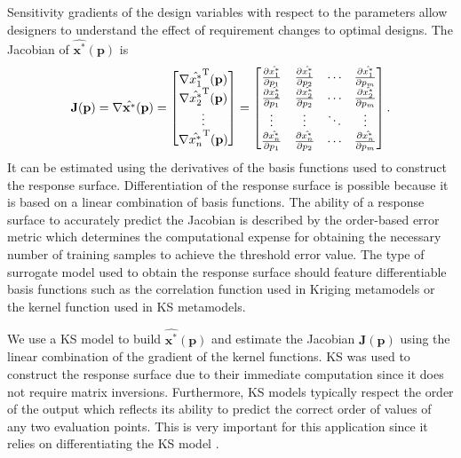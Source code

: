 Sensitivity gradients of the design variables with respect to the parameters allow designers to understand the effect of requirement changes to optimal designs.
The Jacobian of $\hat{\mathbf{x}^*}(\mathbf{p})$ is
\begin{equation}
	\mathbf{J}(\mathbf{p}) = \nabla\hat{\mathbf{x}^*}(\mathbf{p)} = \begin{bmatrix}
	 	\nabla\hat{x_1^*}^{\text T}(\mathbf{p}) \\ 
	 	\nabla\hat{x_2^*}^{\text T}(\mathbf{p}) \\ 
	 	\vdots \\ 
	 	\nabla\hat{x_n^*}^{\text T}(\mathbf{p})
	\end{bmatrix} = \begin{bmatrix}
	 	\frac{\partial \hat{x_1^*}}{\partial p_1} & \frac{\partial \hat{x_1^*}}{\partial p_2} & \cdots & \frac{\partial \hat{x_1^*}}{\partial p_m}\\ 
	 	\frac{\partial \hat{x_2^*}}{\partial p_1} & \frac{\partial \hat{x_2^*}}{\partial p_2} & \cdots & \frac{\partial \hat{x_2^*}}{\partial p_m}\\ 
	 	\vdots & \vdots & \ddots & \vdots\\ 
	 	\frac{\partial \hat{x_n^*}}{\partial p_1} & \frac{\partial \hat{x_n^*}}{\partial p_2} & \cdots & \frac{\partial \hat{x_n^*}}{\partial p_m}\\ 
	\end{bmatrix}.
	 \label{eq:jacobian}
\end{equation}
It can be estimated using the derivatives of the basis functions used to construct the response surface. Differentiation of the response surface is possible because it is based on a linear combination of basis functions. The ability of a response surface to accurately predict the Jacobian is described by the order-based error metric which determines the computational expense for obtaining the necessary number of training samples to achieve the threshold error value. {\color{red} The type of surrogate model used to obtain the response surface should feature differentiable basis functions such as the correlation function used in Kriging metamodels or the kernel function used in \acl{KS} metamodels}.

We use a \acf{KS} model to build  $\hat{\mathbf{x}^*}(\mathbf{p})$ and estimate the Jacobian $\mathbf{J}(\mathbf{p})$ using the linear combination of the gradient of the kernel functions. \ac{KS} was used to construct the response surface due to their immediate computation since it does not require matrix inversions. Furthermore, \ac{KS} models typically respect the order of the output which reflects its ability to predict the correct order of values of any two evaluation points. This is very important for this application since it relies on differentiating the KS model \cite{Audet2018}.

